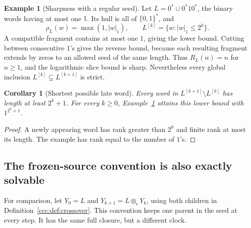 \documentclass[11pt,letterpaper]{article}
\newtheorem{corollary}[theorem]{Corollary}
\theoremstyle{definition}
\newtheorem{example}[theorem]{Example}
\theoremstyle{remark}
\newcommand{\cut}{\otimes_{\mathrm c}}
\newcommand{\gen}[2]{#1^{[#2]}}
\newcommand{\rank}{\rho}
\begin{document}
\begin{example}[Sharpness with a regular seed]\label{ccc:ex:oneone}
Let $L=0^*\cup0^*10^*$, the binary words having at most one $1$. Its hull is
all of $\{0,1\}^*$, and
\[
 \rank_L(w)=\max(1,|w|_1),\qquad
 \gen Lk=\{w:|w|_1\leq2^k\}.
\]
A compatible fragment contains at most one $1$, giving the lower bound.
Cutting between consecutive $1$'s gives the reverse bound, because each
resulting fragment extends by zeros to an allowed seed of the same length.
Thus $R_L(n)=n$ for $n\geq1$, and the logarithmic slice bound is sharp.
Nevertheless every global inclusion $\gen Lk\subsetneq\gen L{k+1}$ is strict.
\end{example}

\begin{corollary}[Shortest possible late word]\label{ccc:cor:lateword}
Every word in $\gen L{k+1}\setminus\gen Lk$ has length at least $2^k+1$.
For every $k\geq0$, Example~\ref{ccc:ex:oneone} attains this lower bound with
$1^{2^k+1}$.
\end{corollary}
\begin{proof}
A newly appearing word has rank greater than $2^k$ and finite rank at most its
length. The example has rank equal to the number of $1$'s.
\end{proof}


\subsection{The frozen-source convention is also exactly solvable}

For comparison, let $Y_0=L$ and $Y_{k+1}=L\cut Y_k$, using both children in
Definition~\ref{ccc:def:crossover}. This convention keeps one parent in the seed
at every step. It has the same full closure, but a different clock.
\end{document}
